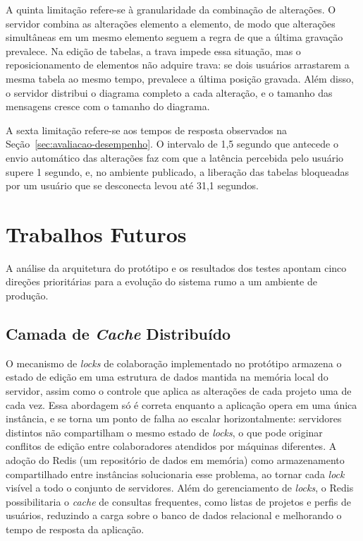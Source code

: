 A quinta limitação refere-se à granularidade da combinação de alterações. O servidor combina as alterações elemento a elemento, de modo que alterações simultâneas em um mesmo elemento seguem a regra de que a última gravação prevalece. Na edição de tabelas, a trava impede essa situação, mas o reposicionamento de elementos não adquire trava: se dois usuários arrastarem a mesma tabela ao mesmo tempo, prevalece a última posição gravada. Além disso, o servidor distribui o diagrama completo a cada alteração, e o tamanho das mensagens cresce com o tamanho do diagrama.

A sexta limitação refere-se aos tempos de resposta observados na Seção~\ref{sec:avaliacao-desempenho}. O intervalo de 1,5 segundo que antecede o envio automático das alterações faz com que a latência percebida pelo usuário supere 1 segundo, e, no ambiente publicado, a liberação das tabelas bloqueadas por um usuário que se desconecta levou até 31,1 segundos.

\section{Trabalhos Futuros}

A análise da arquitetura do protótipo e os resultados dos testes apontam cinco direções prioritárias para a evolução do sistema rumo a um ambiente de produção.

\subsection{Camada de \textit{Cache} Distribuído}

O mecanismo de \textit{locks} de colaboração implementado no protótipo armazena o estado de edição em uma estrutura de dados mantida na memória local do servidor, assim como o controle que aplica as alterações de cada projeto uma de cada vez. Essa abordagem só é correta enquanto a aplicação opera em uma única instância, e se torna um ponto de falha ao escalar horizontalmente: servidores distintos não compartilham o mesmo estado de \textit{locks}, o que pode originar conflitos de edição entre colaboradores atendidos por máquinas diferentes. A adoção do Redis (um repositório de dados em memória) como armazenamento compartilhado entre instâncias solucionaria esse problema, ao tornar cada \textit{lock} visível a todo o conjunto de servidores. Além do gerenciamento de \textit{locks}, o Redis possibilitaria o \textit{cache} de consultas frequentes, como listas de projetos e perfis de usuários, reduzindo a carga sobre o banco de dados relacional e melhorando o tempo de resposta da aplicação.

